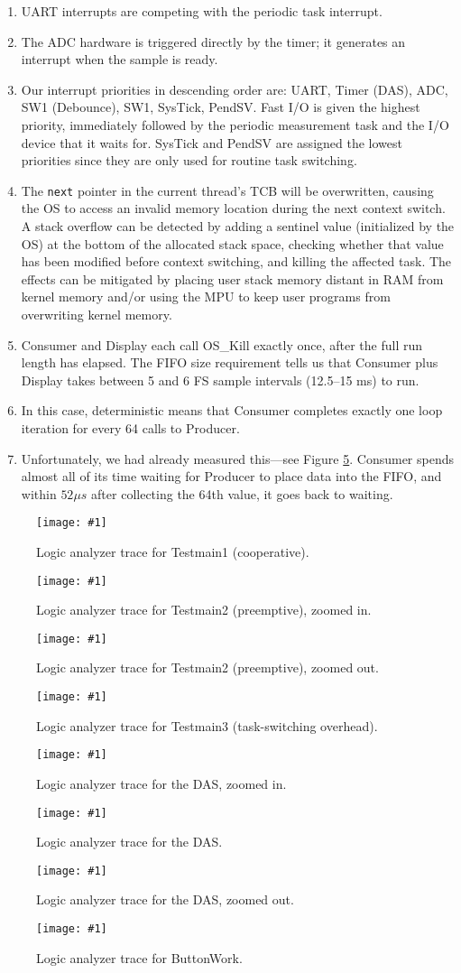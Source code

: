 \documentclass{IEEEtran}
\newcommand*{\gfxfigure}[2]{
  \begin{figure}
    \centering
    \texttt{[image: \#1]}
    \caption{#2}
    \label{fig:#1}
  \end{figure}
}
\begin{document}
\begin{enumerate}
\item UART interrupts are competing with the periodic task interrupt.
\item The ADC hardware is triggered directly by the timer; it generates an interrupt when the sample is ready.
\item Our interrupt priorities in descending order are: UART, Timer (DAS), ADC, SW1 (Debounce), SW1, SysTick, PendSV. Fast I/O is given the highest priority, immediately followed by the periodic measurement task and the I/O device that it waits for. SysTick and PendSV are assigned the lowest priorities since they are only used for routine task switching.
\item The \texttt{next} pointer in the current thread's TCB will be overwritten, causing the OS to access an invalid memory location during the next context switch. A stack overflow can be detected by adding a sentinel value (initialized by the OS) at the bottom of the allocated stack space, checking whether that value has been modified before context switching, and killing the affected task. The effects can be mitigated by placing user stack memory distant in RAM from kernel memory and/or using the MPU to keep user programs from overwriting kernel memory.
\item Consumer and Display each call OS\_Kill exactly once, after the full run length has elapsed. The FIFO size requirement tells us that Consumer plus Display takes between 5 and 6 FS sample intervals (12.5--15 ms) to run.
\item In this case, deterministic means that Consumer completes exactly one loop iteration for every 64 calls to Producer.  
\item Unfortunately, we had already measured this---see Figure \ref{fig:main-adc}. Consumer spends almost all of its time waiting for Producer to place data into the FIFO, and within $52\mu s$ after collecting the 64th value, it goes back to waiting.
\end{enumerate}

\gfxfigure{test1-detail}{Logic analyzer trace for Testmain1 (cooperative).}
\gfxfigure{test2-task-switch}{Logic analyzer trace for Testmain2 (preemptive), zoomed in.}
\gfxfigure{test2-overview}{Logic analyzer trace for Testmain2 (preemptive), zoomed out.}
\gfxfigure{test3-task-switch}{Logic analyzer trace for Testmain3 (task-switching overhead).}

\gfxfigure{main-adc}{Logic analyzer trace for the DAS, zoomed in.}
\gfxfigure{main-waiting}{Logic analyzer trace for the DAS.}
\gfxfigure{main-display}{Logic analyzer trace for the DAS, zoomed out.}
\gfxfigure{main-button}{Logic analyzer trace for ButtonWork.}
\end{document}
